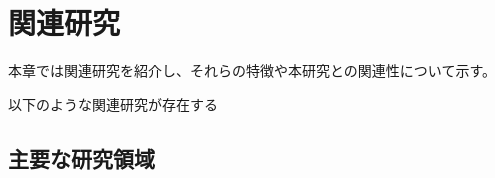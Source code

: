 \chapter{関連研究}
\label{chap:kanren}

本章では関連研究を紹介し、それらの特徴や本研究との関連性について示す。

\newpage

以下のような関連研究が存在する

\section{主要な研究領域}